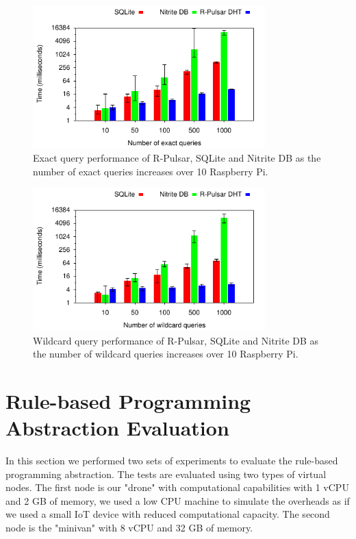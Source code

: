 \begin{figure}[h!]
  \centering
  \includegraphics[width=0.8\textwidth]{Results/DBExactBar}
  \caption{Exact query performance of R-Pulsar, SQLite and Nitrite DB as the number of exact queries increases over 10 Raspberry Pi.}
  \label{fig:DBExactBar}
\end{figure}

\begin{figure}[h!]
  \centering
  \includegraphics[width=0.8\textwidth]{Results/DBWildBar}
  \caption{Wildcard query performance of R-Pulsar, SQLite and Nitrite DB as the number of wildcard queries increases over 10 Raspberry Pi.}
  \label{fig:DBWildBar}
\end{figure}


\section{Rule-based Programming Abstraction Evaluation}

In this section we performed two sets of experiments to evaluate the rule-based programming abstraction. The tests are evaluated using two types of virtual nodes. The first node is our "drone" with computational capabilities with 1 vCPU and 2 GB of memory, we used a low CPU machine to simulate the overheads as if we used a small IoT device with reduced computational capacity. The second node is the "minivan" with 8 vCPU and 32 GB of memory.

